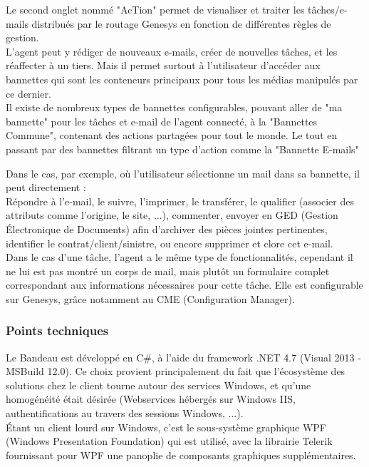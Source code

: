 \documentclass{rapport}
\begin{document}
Le second onglet nommé "AcTion" permet de visualiser et traiter les tâches/e-mails distribués par le routage Genesys en fonction de différentes règles de gestion.\\

L'agent peut y rédiger de nouveaux e-mails, créer de nouvelles tâches, et les réaffecter à un tiers. Mais il permet surtout à l'utilisateur d'accéder aux bannettes qui sont les conteneurs principaux pour tous les médias manipulés par ce dernier. \\
Il existe de nombreux types de bannettes configurables, pouvant aller de "ma bannette" pour les tâches et e-mail de l'agent connecté, à la "Bannettes Commune", contenant des actions partagées pour tout le monde. Le tout en passant par des bannettes filtrant un type d'action comme la "Bannette E-mails"\\



Dans le cas, par exemple, où l'utilisateur sélectionne un mail dans sa bannette, il peut directement :\\
Répondre à l'e-mail, le suivre, l'imprimer, le transférer, le qualifier (associer des attributs comme l'origine, le site, ...), commenter, envoyer en GED (Gestion Électronique de Documents) afin d'archiver des pièces jointes pertinentes, identifier le contrat/client/sinistre, ou encore supprimer et clore cet e-mail.\\

Dans le cas d'une tâche, l'agent a le même type de fonctionnalités, cependant il ne lui est pas montré un corps de mail, mais plutôt un formulaire complet correspondant aux informations nécessaires pour cette tâche. Elle est configurable sur Genesys, grâce notamment au CME (Configuration Manager).

\subsubsection{Points techniques}

Le Bandeau est développé en C\#, à l'aide du framework .NET 4.7 (Visual 2013 - MSBuild 12.0). Ce choix provient principalement du fait que l'écosystème des solutions chez le client tourne autour des services Windows, et qu'une homogénéité était désirée (Webservices hébergés sur Windows IIS, authentifications au travers des sessions Windows, ...).\\
Étant un client lourd sur Windows, c'est le sous-système graphique WPF (Windows Presentation Foundation) qui est utilisé, avec la librairie Telerik fournissant pour WPF une panoplie de composants graphiques supplémentaires.\\
\end{document}
